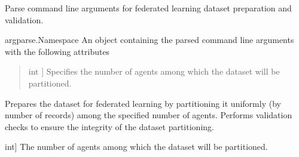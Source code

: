 \documentclass[letterpaper,10pt,english]{sphinxmanual}
\begin{document}

\begin{fulllineitems}
\label{\detokenize{prepare_dataset:prepare_dataset.parse_arguments}}
\pysigstartsignatures
{}
\pysigstopsignatures
\sphinxAtStartPar
Parse command line arguments for federated learning dataset preparation and validation.
\begin{description}
\sphinxAtStartPar
argparse.Namespace 
An object containing the parsed command line arguments with the following attributes
\begin{quote}
\begin{description}
\sphinxlineitem{num\_agents}{[}int {]}
\sphinxAtStartPar
Specifies the number of agents among which the dataset will be partitioned.

\end{description}
\end{quote}

\end{description}

\end{fulllineitems}


\begin{fulllineitems}
\label{\detokenize{prepare_dataset:prepare_dataset.prepare_and_validate_dataset}}
\pysigstartsignatures
{}
\pysigstopsignatures
\sphinxAtStartPar
Prepares the dataset for federated learning by partitioning it uniformly (by number of records) among the specified number of agents.
Performs validation checks to ensure the integrity of the dataset partitioning.
\begin{description}
\begin{description}
\sphinxlineitem{num\_agents}{[}int{]}
\sphinxAtStartPar
The number of agents among which the dataset will be partitioned.

\end{description}

\end{description}

\end{fulllineitems}
\end{document}
